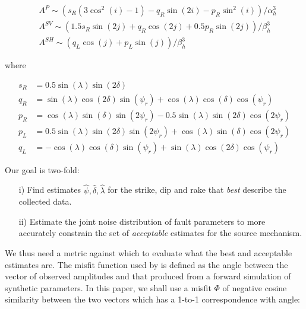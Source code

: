 \documentclass[preprint]{seismica}
\begin{document}
    \begin{align} \label{eq:1}
      \nonumber &A^P \sim \left( s_R(3\cos^2(i) - 1) - q_R\sin(2i) - p_R\sin^2(i)\right)/\alpha_h^3\\
      \nonumber &A^{SV} \sim \left( 1.5 s_R\sin(2j) + q_R\cos(2j) + 0.5 p_R\sin(2j) \right)/\beta_h^3\\
      &A^{SH} \sim \left( q_L\cos(j) + p_L\sin(j) \right)/\beta_h^3
    \end{align}

    where

    \begin{align} \label{eq:2}
      \nonumber s_R &= 0.5 \sin(\lambda) \sin(2\delta)\\
      \nonumber q_R &= \sin(\lambda) \cos(2\delta) \sin(\psi_r) + \cos(\lambda) \cos(\delta) \cos(\psi_r)\\
      \nonumber p_R &= \cos(\lambda) \sin(\delta) \sin(2\psi_r) - 0.5\sin(\lambda) \sin(2\delta) \cos(2\psi_r)\\
      \nonumber p_L &= 0.5\sin(\lambda) \sin(2\delta) \sin(2\psi_r) + \cos(\lambda) \sin(\delta) \cos(2\psi_r)\\
      q_L &= -\cos(\lambda) \cos(\delta) \sin(\psi_r) + \sin(\lambda) \cos(2\delta) \cos(\psi_r)
    \end{align}

    Our goal is two-fold:
    \begin{enumerate}
      \item [i)]
        Find estimates $\widehat{\psi}, \widehat{\delta}, \widehat{\lambda}$ for the strike, dip
        and rake that \textit{best} describe the collected data.

      \item [ii)]
        Estimate the joint noise distribution of fault parameters to more accurately constrain the
        set of \textit{acceptable} estimates for the source mechanism.
        
    \end{enumerate}

    We thus need a metric against which to evaluate what the best and acceptable estimates are. The
    misfit function used by \citet{sita_potential_2022} is defined as the angle between the vector of
    observed amplitudes and that produced from a forward simulation of synthetic parameters.
    In this paper, we shall use a misfit $\Phi$ of negative cosine similarity between the two vectors
    which has a 1-to-1 correspondence with angle:
\end{document}
